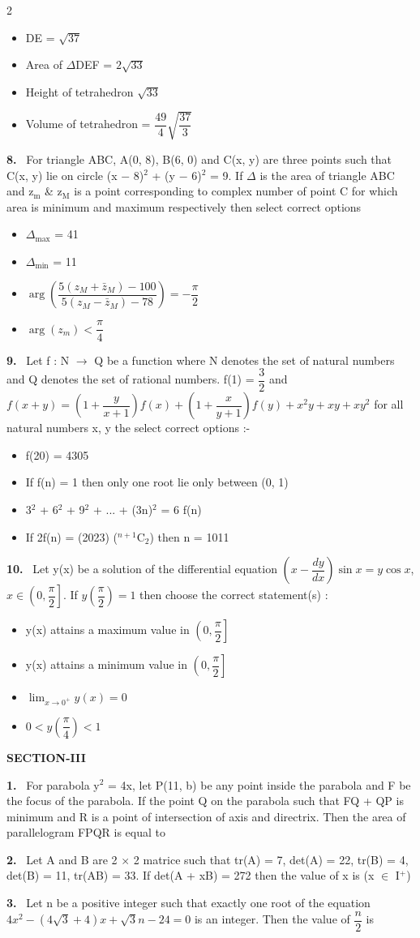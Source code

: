 \documentclass[10pt]{extarticle}
\newcommand{\sect}[1]{\par\smallskip\noindent\textbf{#1}\par}
\newcommand{\qn}[1]{\par\smallskip\noindent\textbf{#1.}~}
\newenvironment{qoptions}{\begin{itemize}[leftmargin=1.8em,itemsep=1pt,topsep=2pt,label={}]}{\end{itemize}}
\newcommand{\opt}[2]{\item[(#1)] #2}
\begin{document}
\begin{multicols}{2}
\begin{qoptions}
\opt{A}{DE = $\sqrt{37}$}
\opt{B}{Area of $\Delta$DEF = $2\sqrt{33}$}
\opt{C}{Height of tetrahedron $\sqrt{33}$}
\opt{D}{Volume of tetrahedron = $\dfrac{49}4\sqrt{\dfrac{37}3}$}
\end{qoptions}
\qn{8} For triangle ABC, A(0, 8), B(6, 0) and C(x, y) are three points such that C(x, y) lie on circle (x $-$ 8)$^2$ + (y $-$ 6)$^2$ = 9. If $\Delta$ is the area of triangle ABC and z$_\mathrm m$ \& z$_\mathrm M$ is a point corresponding to complex number of point C for which area is minimum and maximum respectively then select correct options
\begin{qoptions}
\opt{A}{$\Delta_{\max}$ = 41}
\opt{B}{$\Delta_{\min}$ = 11}
\opt{C}{$\arg\left(\dfrac{5\left(z_M+\bar z_M\right)-100}{5\left(z_M-\bar z_M\right)-78}\right)=-\dfrac\pi2$}
\opt{D}{$\arg(z_m)<\dfrac\pi4$}
\end{qoptions}
\qn{9} Let f : N $\longrightarrow$ Q be a function where N denotes the set of natural numbers and Q denotes the set of rational numbers. f(1) = $\dfrac32$ and $f(x+y)=\left(1+\dfrac y{x+1}\right)f(x)+\left(1+\dfrac x{y+1}\right)f(y)+x^2y+xy+xy^2$ for all natural numbers x, y the select correct options :-
\begin{qoptions}
\opt{A}{f(20) = 4305}
\opt{B}{If f(n) = 1 then only one root lie only between (0, 1)}
\opt{C}{3$^2$ + 6$^2$ + 9$^2$ + ... + (3n)$^2$ = 6 f(n)}
\opt{D}{If 2f(n) = (2023) ($^{n+1}$C$_2$) then n = 1011}
\end{qoptions}
\qn{10} Let y(x) be a solution of the differential equation $\left(x-\dfrac{dy}{dx}\right)\sin x=y\cos x$, $x\in\left(0,\dfrac\pi2\right]$. If $y\left(\dfrac\pi2\right)=1$ then choose the correct statement(s) :
\begin{qoptions}
\opt{A}{y(x) attains a maximum value in $\left(0,\dfrac\pi2\right]$}
\opt{B}{y(x) attains a minimum value in $\left(0,\dfrac\pi2\right]$}
\opt{C}{$\displaystyle\lim_{x\to0^+}y(x)=0$}
\opt{D}{$0<y\left(\dfrac\pi4\right)<1$}
\end{qoptions}
\sect{SECTION-III}
\qn{1} For parabola y$^2$ = 4x, let P(11, b) be any point inside the parabola and F be the focus of the parabola. If the point Q on the parabola such that FQ + QP is minimum and R is a point of intersection of axis and directrix. Then the area of parallelogram FPQR is equal to
\qn{2} Let A and B are 2 $\times$ 2 matrice such that tr(A) = 7, det(A) = 22, tr(B) = 4, det(B) = 11, tr(AB) = 33. If det(A + xB) = 272 then the value of x is (x $\in$ I$^+$)
\qn{3} Let n be a positive integer such that exactly one root of the equation $4x^2-\left(4\sqrt3+4\right)x+\sqrt3n-24=0$ is an integer. Then the value of $\dfrac n2$ is

\end{multicols}
\end{document}
